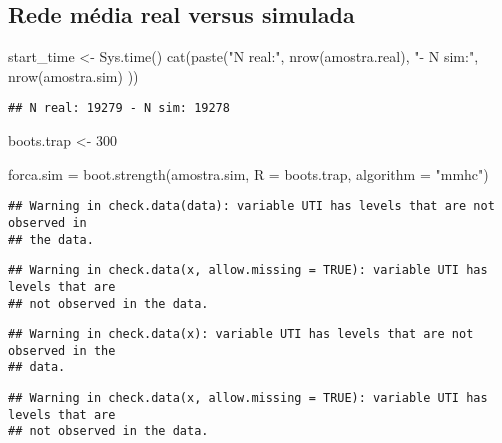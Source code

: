 \documentclass[
]{article}
\newenvironment{Shaded}{\begin{snugshade}}{\end{snugshade}}
\newcommand{\AttributeTok}[1]{\textcolor[rgb]{0.77,0.63,0.00}{#1}}
\newcommand{\DecValTok}[1]{\textcolor[rgb]{0.00,0.00,0.81}{#1}}
\newcommand{\FunctionTok}[1]{\textcolor[rgb]{0.00,0.00,0.00}{#1}}
\newcommand{\NormalTok}[1]{#1}
\newcommand{\OtherTok}[1]{\textcolor[rgb]{0.56,0.35,0.01}{#1}}
\newcommand{\StringTok}[1]{\textcolor[rgb]{0.31,0.60,0.02}{#1}}
\begin{document}
\hypertarget{rede-muxe9dia-real-versus-simulada}{%
\subsection{Rede média real versus
simulada}\label{rede-muxe9dia-real-versus-simulada}}

\begin{Shaded}
\begin{Highlighting}[]
\NormalTok{start\_time }\OtherTok{\textless{}{-}} \FunctionTok{Sys.time}\NormalTok{()}
\FunctionTok{cat}\NormalTok{(}\FunctionTok{paste}\NormalTok{(}\StringTok{"N real:"}\NormalTok{, }\FunctionTok{nrow}\NormalTok{(amostra.real), }\StringTok{"{-} N sim:"}\NormalTok{, }\FunctionTok{nrow}\NormalTok{(amostra.sim) ))}
\end{Highlighting}
\end{Shaded}

\begin{verbatim}
## N real: 19279 - N sim: 19278
\end{verbatim}

\begin{Shaded}
\begin{Highlighting}[]
\NormalTok{boots.trap  }\OtherTok{\textless{}{-}} \DecValTok{300}

\NormalTok{forca.sim }\OtherTok{=} \FunctionTok{boot.strength}\NormalTok{(amostra.sim, }
                         \AttributeTok{R =}\NormalTok{ boots.trap, }
                         \AttributeTok{algorithm =} \StringTok{"mmhc"}\NormalTok{)}
\end{Highlighting}
\end{Shaded}

\begin{verbatim}
## Warning in check.data(data): variable UTI has levels that are not observed in
## the data.
\end{verbatim}

\begin{verbatim}
## Warning in check.data(x, allow.missing = TRUE): variable UTI has levels that are
## not observed in the data.
\end{verbatim}

\begin{verbatim}
## Warning in check.data(x): variable UTI has levels that are not observed in the
## data.
\end{verbatim}

\begin{verbatim}
## Warning in check.data(x, allow.missing = TRUE): variable UTI has levels that are
## not observed in the data.
\end{verbatim}
\end{document}
